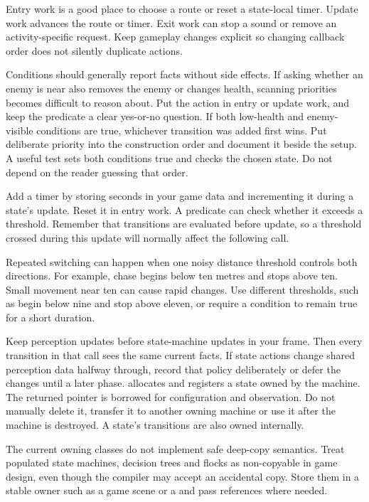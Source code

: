 \documentclass[11pt,a4paper]{article}
\begin{document}
Entry work is a good place to choose a route or reset a state-local timer. Update work advances the route or timer. Exit work can stop a sound or remove an activity-specific request. Keep gameplay changes explicit so changing callback order does not silently duplicate actions.

Conditions should generally report facts without side effects. If asking whether an enemy is near also removes the enemy or changes health, scanning priorities becomes difficult to reason about. Put the action in entry or update work, and keep the predicate a clear yes-or-no question.
If both low-health and enemy-visible conditions are true, whichever transition was added first wins. Put deliberate priority into the construction order and document it beside the setup. A useful test sets both conditions true and checks the chosen state. Do not depend on the reader guessing that order.

Add a timer by storing seconds in your game data and incrementing it during a state's update. Reset it in entry work. A predicate can check whether it exceeds a threshold. Remember that transitions are evaluated before update, so a threshold crossed during this update will normally affect the following call.

Repeated switching can happen when one noisy distance threshold controls both directions. For example, chase begins below ten metres and stops above ten. Small movement near ten can cause rapid changes. Use different thresholds, such as begin below nine and stop above eleven, or require a condition to remain true for a short duration.

Keep perception updates before state-machine updates in your frame. Then every transition in that call sees the same current facts. If state actions change shared perception data halfway through, record that policy deliberately or defer the changes until a later phase.
 allocates and registers a state owned by the machine. The returned pointer is borrowed for configuration and observation. Do not manually delete it, transfer it to another owning machine or use it after the machine is destroyed. A state's transitions are also owned internally.

The current owning classes do not implement safe deep-copy semantics. Treat populated state machines, decision trees and flocks as non-copyable in game design, even though the compiler may accept an accidental copy. Store them in a stable owner such as a game scene or a  and pass references where needed.
\end{document}
